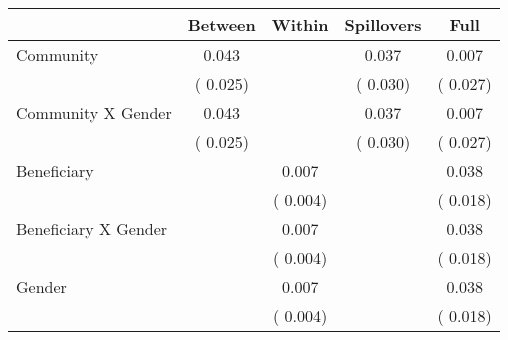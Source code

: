 
\begin{tabular}{l*{4}{c}}\hline&\multicolumn{1}{c}{Between}&\multicolumn{1}{c}{Within}&\multicolumn{1}{c}{Spillovers}&\multicolumn{1}{c}{Full}\\ \hline
 Community                                     &              0.043      &                                               &        0.037 &         0.007                            \\ 
                                                       &        (       0.025)           &                                       &       (       0.030)     &      (       0.027)                                           \\ 
 Community X Gender            &              0.043      &                                               &        0.037 &         0.007                            \\ 
                                                       &        (       0.025)           &                                       &       (       0.030)     &      (       0.027)                                           \\ 
 Beneficiary                           &                                               &        0.007    &                                &             0.038                            \\ 
                                                       &                                               & (       0.004)                  &                                        &      (       0.018)                                           \\ 
 Beneficiary X Gender          &                                               &        0.007    &                                &             0.038                            \\ 
                                                       &                                               & (       0.004)                  &                                        &      (       0.018)                                           \\ 
 Gender                                        &                              &        0.007    &                                &             0.038                            \\ 
                                                       &                                               & (       0.004)                  &                                        &      (       0.018)                                           \\ 

\end{tabular}
